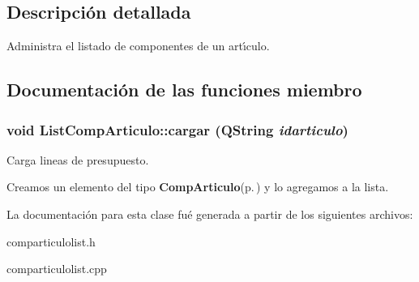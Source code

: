 \subsection{Descripci\'{o}n detallada}
Administra el listado de componentes de un art\'{\i}culo. 



\subsection{Documentaci\'{o}n de las funciones miembro}
\subsubsection{\setlength{\rightskip}{0pt plus 5cm}void List\-Comp\-Articulo::cargar (QString {\em idarticulo})}\label{classListCompArticulo_a2}


Carga lineas de presupuesto. 

Creamos un elemento del tipo {\bf Comp\-Articulo}{\rm (p.\,\pageref{classCompArticulo})} y lo agregamos a la lista. 

La documentaci\'{o}n para esta clase fu\'{e} generada a partir de los siguientes archivos:\begin{CompactItemize}
\item 
comparticulolist.h\item 
comparticulolist.cpp\end{CompactItemize}
